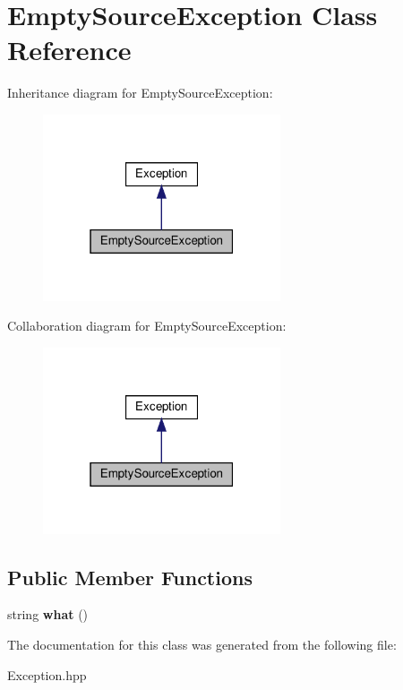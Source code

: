 \hypertarget{classEmptySourceException}{}\section{Empty\+Source\+Exception Class Reference}
\label{classEmptySourceException}


Inheritance diagram for Empty\+Source\+Exception\+:
\nopagebreak
\begin{figure}[H]
\begin{center}
\leavevmode
\includegraphics[width=199pt]{classEmptySourceException__inherit__graph}
\end{center}
\end{figure}


Collaboration diagram for Empty\+Source\+Exception\+:
\nopagebreak
\begin{figure}[H]
\begin{center}
\leavevmode
\includegraphics[width=199pt]{classEmptySourceException__coll__graph}
\end{center}
\end{figure}
\subsection*{Public Member Functions}
\begin{DoxyCompactItemize}
\item 
\mbox{\label{classEmptySourceException_a0d97e2edacbd6dda86b098ac79fffe78}} 
string {\bfseries what} ()
\end{DoxyCompactItemize}


The documentation for this class was generated from the following file\+:\begin{DoxyCompactItemize}
\item 
Exception.\+hpp\end{DoxyCompactItemize}
